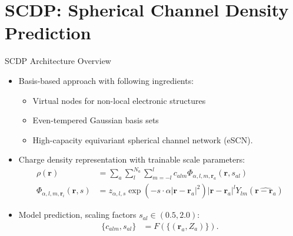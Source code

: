 \section{SCDP: Spherical Channel Density Prediction}

\begin{frame}{SCDP Architecture Overview}
    \begin{itemize}
        \item Basis-based approach with following ingredients:
        \begin{itemize}
            \item Virtual nodes for non-local electronic structures
            \item Even-tempered Gaussian basis sets
            \item High-capacity equivariant spherical channel network (eSCN).
        \end{itemize}
        \item Charge density representation with trainable scale parameters:
        \begin{align*}
            \rho(\mathbf{r}) &= \sum_a \sum_l^{N_a} \sum_{m = -l}^{l} c_{alm}
            \Phi_{\alpha,l,m,\mathbf{r}_a}(\mathbf{r}, s_{al}) \\
            \Phi_{\alpha,l,m,\mathbf{r}_i}(\mathbf{r}, s) &= 
            z_{\alpha,l,s} \exp(-s \cdot \alpha |\mathbf{r} - \mathbf{r}_a|^2) 
            |\mathbf{r} - \mathbf{r}_a|^l Y_{lm}(
                \widehat{\mathbf{r} - \mathbf{r}_a})
        \end{align*}
        \item Model prediction, scaling factors $s_{al} \in (0.5, 2.0)$:
        \begin{align*}
            \{c_{alm}, s_{al}\} &= F(\{(\mathbf{r}_a, Z_a)\}).
        \end{align*}
    \end{itemize}
\end{frame}


